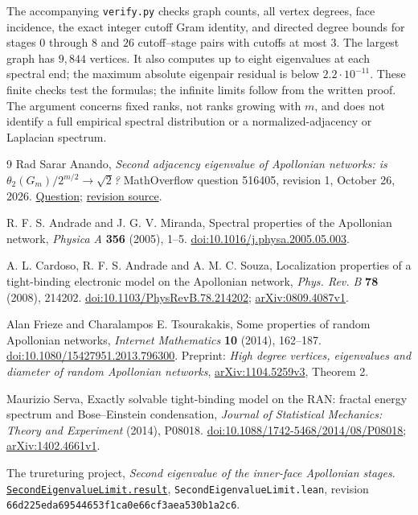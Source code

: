 \documentclass[11pt]{article}
\begin{document}
The accompanying \texttt{verify.py} checks graph counts, all vertex degrees,
face incidence, the exact integer cutoff Gram identity, and directed
degree bounds for stages $0$ through $8$ and $26$ cutoff--stage pairs
with cutoffs at most $3$. The largest graph has $9{,}844$ vertices.
It also computes up to eight eigenvalues at each spectral end; the
maximum absolute eigenpair residual is below $2.2\cdot10^{-11}$.
These finite checks test the formulas; the infinite limits follow
from the written proof. The argument concerns fixed ranks, not ranks
growing with $m$, and does not identify a full empirical spectral
distribution or a normalized-adjacency or Laplacian spectrum.

\begin{thebibliography}{9}
Rad Sarar Anando,
\emph{Second adjacency eigenvalue of Apollonian networks: is
$\theta_2(G_m)/2^{m/2}\to\sqrt2$?}
MathOverflow question 516405, revision 1, October 26, 2026.
\href{https://mathoverflow.net/questions/516405}{Question};
\href{https://mathoverflow.net/revisions/8C9D6CD5-E3A3-4B25-BDB6-FF5A9A3D3A2B/view-source}{revision source}.

R. F. S. Andrade and J. G. V. Miranda,
Spectral properties of the Apollonian network,
\emph{Physica A} \textbf{356} (2005), 1--5.
\href{https://doi.org/10.1016/j.physa.2005.05.003}{doi:10.1016/j.physa.2005.05.003}.

A. L. Cardoso, R. F. S. Andrade and A. M. C. Souza,
Localization properties of a tight-binding electronic model on the
Apollonian network, \emph{Phys. Rev. B} \textbf{78} (2008), 214202.
\href{https://doi.org/10.1103/PhysRevB.78.214202}{doi:10.1103/PhysRevB.78.214202};
\href{https://arxiv.org/abs/0809.4087v1}{arXiv:0809.4087v1}.

Alan Frieze and Charalampos E. Tsourakakis,
Some properties of random Apollonian networks,
\emph{Internet Mathematics} \textbf{10} (2014), 162--187.
\href{https://doi.org/10.1080/15427951.2013.796300}{doi:10.1080/15427951.2013.796300}.
Preprint: \emph{High degree vertices, eigenvalues and diameter of random
Apollonian networks},
\href{https://arxiv.org/abs/1104.5259v3}{arXiv:1104.5259v3}, Theorem 2.

Maurizio Serva,
Exactly solvable tight-binding model on the RAN: fractal energy spectrum
and Bose--Einstein condensation,
\emph{Journal of Statistical Mechanics: Theory and Experiment}
(2014), P08018.
\href{https://doi.org/10.1088/1742-5468/2014/08/P08018}{doi:10.1088/1742-5468/2014/08/P08018};
\href{https://arxiv.org/abs/1402.4661v1}{arXiv:1402.4661v1}.

The trureturing project,
\emph{Second eigenvalue of the inner-face Apollonian stages}.
\href{https://github.com/the-omega-institute/trureturing/blob/66d225eda69544653f1ca0e66cf3aea530b1a2c6/D5/S3/Combinatorics/Apollonian/SecondEigenvalueLimit.lean}{\texttt{SecondEigenvalueLimit.result}},
\texttt{SecondEigenvalueLimit.lean}, revision
\texttt{66d225eda69544653f1ca0e66cf3aea530b1a2c6}.
\end{thebibliography}
\end{document}
